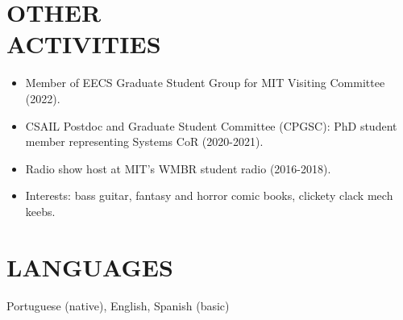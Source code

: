 \documentclass[line,margin]{res}
\begin{document}
\begin{resume}
\section{OTHER \\ ACTIVITIES}
  \begin{itemize}  \itemsep -2pt
  \item Member of EECS Graduate Student Group for MIT Visiting Committee (2022).
  \item CSAIL Postdoc and Graduate Student Committee (CPGSC): PhD student member representing Systems CoR (2020-2021).
  \item Radio show host at MIT's WMBR student radio (2016-2018).
  \item Interests: bass guitar, fantasy and horror comic books, clickety clack mech keebs.
  \end{itemize}

\section{LANGUAGES}
Portuguese (native), English, Spanish (basic)

\end{resume}
\end{document}
